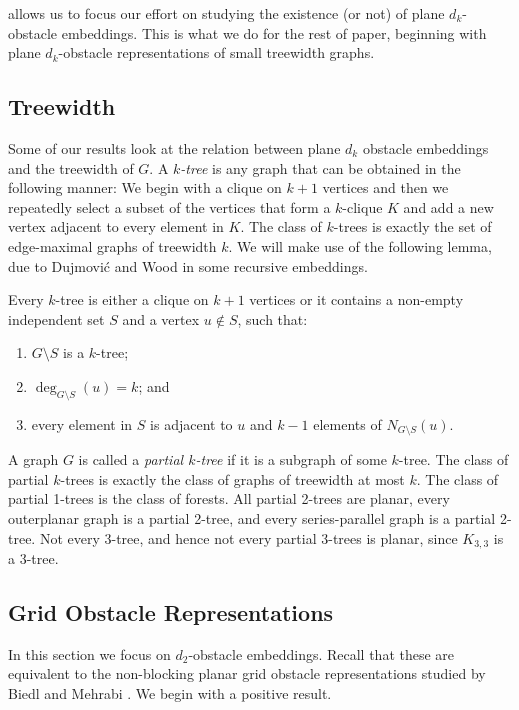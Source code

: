 \documentclass{patmorin}
\begin{document}
 allows us to focus our effort on studying the existence
(or not) of plane $d_k$-obstacle embeddings.  This is what we do for
the rest of paper, beginning with plane $d_k$-obstacle representations
of small treewidth graphs.

\subsection{Treewidth}

Some of our results look at the relation between plane $d_k$ obstacle
embeddings and the treewidth of $G$.  A \emph{$k$-tree} is any graph that
can be obtained in the following manner:  We begin with a clique on $k+1$
vertices and then we repeatedly select a subset of the vertices that
form a $k$-clique $K$ and add a new vertex adjacent to every element
in $K$.  The class of $k$-trees is exactly the set of edge-maximal
graphs of treewidth $k$.  We will make use of the following lemma,
due to Dujmovi\'c and Wood \cite[Lemma~1]{dujmovic.wood:graph2007}
in some recursive embeddings.

\begin{lem}
   Every $k$-tree is either a clique on $k+1$ vertices or it contains a non-empty independent set $S$ and a vertex $u\not\in S$, such that:
\begin{enumerate}
   \item $G\setminus S$ is a $k$-tree;
   \item $\deg_{G\setminus S}(u)=k$; and 
   \item every element in $S$ is adjacent to $u$ and $k-1$ elements of
   $N_{G\setminus S}(u)$.
\end{enumerate}
\end{lem}

A graph $G$ is called a \emph{partial $k$-tree} if it is a subgraph of
some $k$-tree.  The class of partial $k$-trees is exactly the class of
graphs of treewidth at most $k$.  The class of partial 1-trees is the
class of forests.  All partial 2-trees are planar, every outerplanar graph
is a partial 2-tree, and every series-parallel graph is a partial 2-tree.
Not every 3-tree, and hence not every partial 3-trees is planar, since
$K_{3,3}$ is a 3-tree.

\subsection{Grid Obstacle Representations}

In this section we focus on $d_2$-obstacle embeddings.  Recall that these
are equivalent to the non-blocking planar grid obstacle representations
studied by Biedl and Mehrabi \cite{X}.  We begin with a positive result.
\end{document}
